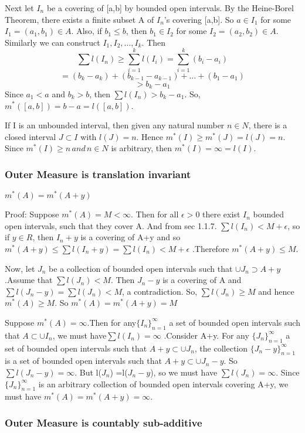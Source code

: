 \documentclass{article}
\begin{document}
Next let ${I_n}$ be a covering of [a,b] by bounded open intervals. By the Heine-Borel Theorem, there exists a finite subset A of $I_n$'s covering [a,b]. So $a \in I_1$ for some $I_1 =(a_1,b_1) \in A$. Also, if $b_1 \leq b$, then $b_1 \in I_2 $ for some $I_2 =(a_2,b_2) \in A$. Similarly we can construct $I_1,I_2,\dots,I_k$. Then
$$ \sum l(I_n) \geq \sum_{i=1}^k l(I_i) = \sum_{i=1}^{k}(b_i - a_i)$$
$$=(b_k-a_k) +(b_{k-1} -a_{k-1})+ \dots + (b_1 - a_1) $$
$$ >b_k -a_1$$
Since $a_1<a$ and $b_k>b$, then $ \sum l(I_n) > b_k -a_1 $. So, $m^*([a,b]) = b-a = l([a,b])$.

If I is an unbounded interval, then given any natural number $n \in N$, there is a closed interval $J \subset I$ with $l(J)=n$. Hence $m^*(I) \geq m^*(J) = l(J)=n$. Since $m^*(I) \geq n \, and \, n \in N$ is arbitrary, then $m^*(I)=\infty=l(I)$. 

\subsubsection{Outer Measure is translation invariant}
$m^*(A)=m^*(A+y)$

Proof: Suppose $m^*(A) = M < \infty$. Then for all $\epsilon > 0 $ there exist ${I_n}$ bounded open intervals, such that they cover A. And from sec 1.1.7. $\sum l(I_n) < M+ \epsilon$, so if $y \in R$, then ${I_{n}+y}$ is a covering of A+y and so $m^{*}(A+y) \leq \sum l(I_n + y ) = \sum l(I_n) < M + \epsilon$ .Therefore $m^*(A+y) \leq M$.

Now, let ${J_n}$ be a collection of bounded open intervals such that $\cup J_n \supset A+y $.Assume that $\sum l(J_n)< M$. Then ${J_n-y}$ is a covering of A and $\sum l(J_n-y)=\sum l(J_n) < M$, a contradiction. So, $\sum l(J_n) \geq M$ and hence $m^*(A)\geq M$. So $m^*(A)=m^*(A+y)=M$

Suppose $m^*(A)= \infty$.Then for any$\{I_n\}_{n=1}^{\infty} $ a set of bounded open intervals such that $A \subset \cup I_n$, we must
have$\sum l(I_n) =\infty$ .Consider A+y. For any $\{J_n\}_{n=1}^{\infty} $ a set of bounded open intervals such that $A+y \subset \cup J_n$, the collection $\{J_n - y\}_{n=1}^{\infty} $ is a set of bounded open intervals such that $A+y \subset \cup J_n -y$. So $\sum l(J_n - y) =\infty$. But l($J_n$) =l($J_n - y$), so we must have $\sum l(J_n) =\infty$. Since $\{J_n\}_{n=1}^{\infty} $ is an arbitrary collection of bounded open intervals covering A+y, we must have $m^*(A)=m^*(A+y)= \infty$. 

\subsubsection{Outer Measure is countably sub-additive}
\end{document}
